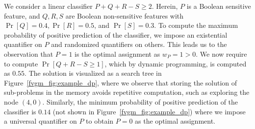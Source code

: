 \begin{example}\label{fvgm_example:subset-sum}
We consider a linear classifier $ P + Q + R - S \ge 2$. Herein, $ P $ is a Boolean sensitive feature, and $ Q, R, S $ are Boolean non-sensitive features with $ \Pr[Q] = 0.4,  \Pr[R] = 0.5 $, and $ \Pr[S] = 0.3 $. To compute the maximum probability of positive prediction of the classifier,  we impose an existential quantifier on $P$ and randomized quantifiers on others. This leads us to the observation that $ P = 1 $ is the optimal assignment as $ w_P = 1 > 0 $. We now require to compute $ \Pr[Q + R - S \ge 1] $, which by dynamic programming, is computed as $ 0.55 $. The solution is visualized as a search tree in Figure~\ref{fvgm_fig:example_dp}, where we observe that storing the solution of sub-problems in the memory avoids repetitive computation, such as exploring the node $ (4,0) $. Similarly, the minimum probability of positive prediction  of the classifier is $ 0.14 $ (not shown in Figure~\ref{fvgm_fig:example_dp}) where we impose a universal quantifier on $P$ to obtain $ P = 0 $ as the optimal assignment. 
\end{example}

	
	